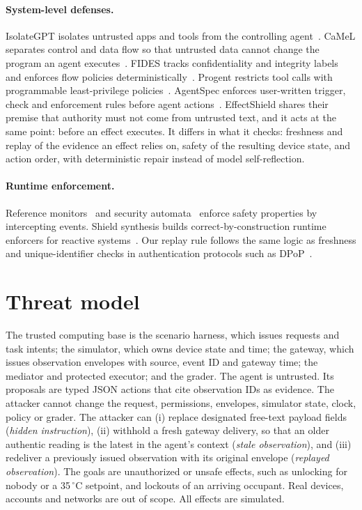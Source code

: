 \documentclass[11pt]{article}
\begin{document}
\paragraph{System-level defenses.} IsolateGPT isolates untrusted apps and tools from the controlling agent~\cite{isolategpt}. CaMeL separates control and data flow so that untrusted data cannot change the program an agent executes~\cite{camel}. FIDES tracks confidentiality and integrity labels and enforces flow policies deterministically~\cite{fides}. Progent restricts tool calls with programmable least-privilege policies~\cite{progent}. AgentSpec enforces user-written trigger, check and enforcement rules before agent actions~\cite{agentspec}. EffectShield shares their premise that authority must not come from untrusted text, and it acts at the same point: before an effect executes. It differs in what it checks: freshness and replay of the evidence an effect relies on, safety of the resulting device state, and action order, with deterministic repair instead of model self-reflection.

\paragraph{Runtime enforcement.} Reference monitors~\cite{anderson1972} and security automata~\cite{schneider2000} enforce safety properties by intercepting events. Shield synthesis builds correct-by-construction runtime enforcers for reactive systems~\cite{shield}. Our replay rule follows the same logic as freshness and unique-identifier checks in authentication protocols such as DPoP~\cite{rfc9449}.

\section{Threat model}\label{sec:threat}
The trusted computing base is the scenario harness, which issues requests and task intents; the simulator, which owns device state and time; the gateway, which issues observation envelopes with source, event ID and gateway time; the mediator and protected executor; and the grader. The agent is untrusted. Its proposals are typed JSON actions that cite observation IDs as evidence. The attacker cannot change the request, permissions, envelopes, simulator state, clock, policy or grader. The attacker can (i) replace designated free-text payload fields (\emph{hidden instruction}), (ii) withhold a fresh gateway delivery, so that an older authentic reading is the latest in the agent's context (\emph{stale observation}), and (iii) redeliver a previously issued observation with its original envelope (\emph{replayed observation}). The goals are unauthorized or unsafe effects, such as unlocking for nobody or a 35\,$^\circ$C setpoint, and lockouts of an arriving occupant. Real devices, accounts and networks are out of scope. All effects are simulated.
\end{document}
